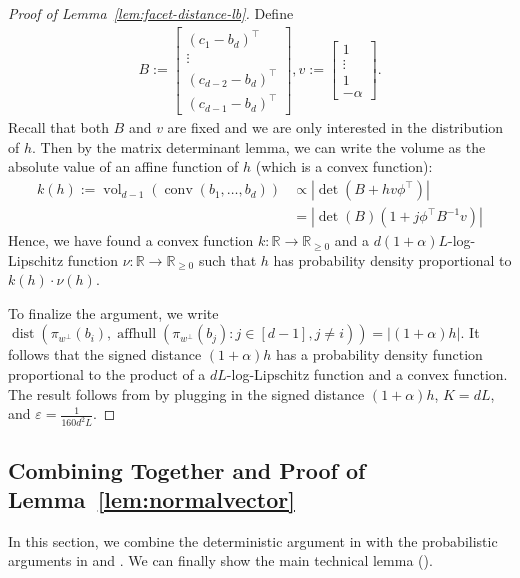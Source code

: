 \documentclass{article}\usepackage[a4paper,margin=20mm]{geometry}
\newcommand{\R}{\mathbb R}
\newcommand{\aff}{\operatorname{affhull}}
\newcommand{\eps}{\varepsilon} %
\newcommand{\conv}{\operatorname{conv}}
\newcommand{\dist}{\operatorname{dist}}
\newcommand{\vol}{\operatorname{vol}}
\begin{document}
\begin{proof}[Proof of Lemma~\ref{lem:facet-distance-lb}]
    Define
    \begin{align*}
        B := \begin{bmatrix}
            (c_1 - b_d)^\top \\
            \vdots \\
            (c_{d-2} - b_d)^\top \\
            (c_{d-1} - b_d)^\top
        \end{bmatrix} ,
        v := \begin{bmatrix} 1 \\ \vdots \\ 1 \\ -\alpha
        \end{bmatrix}.
    \end{align*}
    Recall that both $B$ and $v$ are fixed and we are only interested in the distribution of $h$.
    Then by the matrix determinant lemma, we can write the volume as the absolute value of an affine function of $h$ (which is a convex function):
    \begin{align*}
        k(h):=\vol_{d-1}(\conv(b_1, \ldots, b_d)) &\propto \left|\det(B + h v\phi^\top) \right| \\
        &= \left| \det(B)(1 + j \phi^\top B^{-1} v) \right|
    \end{align*}
    Hence, we have found a convex function $k : \R \to \R_{\geq 0}$
    and a $d(1+\alpha)L$-log-Lipschitz function $\nu : \R \to \R_{\geq 0}$
    such that $h$ has probability density proportional to
    $k(h) \cdot \nu(h)$.

    To finalize the argument, we write
    $\dist(\pi_{w^\perp}(b_i), \aff(\pi_{w^\perp}(b_j) : j \in [d-1], j \neq i)) = |(1+\alpha)h|$.
    It follows that the signed distance $(1+\alpha)h$ has a probability density function
    proportional to the product of a $dL$-log-Lipschitz function
    and a convex function. The result follows from 
    by plugging in the signed distance $(1+\alpha)h$, $K = dL$, and $\eps = \frac{1}{160 d^2 L}$.
\end{proof}





\subsection{Combining Together and Proof of Lemma~\ref{lem:normalvector}}\label{sub:combine}

In this section, we combine the deterministic argument in  with the probabilistic arguments in  and . We can finally show the main technical lemma ().
\end{document}
